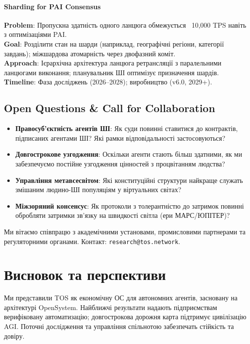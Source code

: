 \documentclass[11pt]{article}
\begin{document}
\paragraph{Sharding for PAI Consensus}
\textbf{Problem}: Пропускна здатність одного ланцюга обмежується ~10,000 TPS навіть з оптимізаціями PAI.\\
\textbf{Goal}: Розділити стан на шарди (наприклад, географічні регіони, категорії завдань); міжшардова атомарність через двофазний коміт.\\
\textbf{Approach}: Ієрархічна архітектура ланцюга ретрансляції з паралельними ланцюгами виконання; планувальник ШІ оптимізує призначення шардів.\\
\textbf{Timeline}: Фаза досліджень (2026--2028); виробництво (v6.0, 2029+).

\subsection{Open Questions \& Call for Collaboration}

\begin{itemize}[noitemsep]
  \item \textbf{Правосуб'єктність агентів ШІ}: Як суди повинні ставитися до контрактів, підписаних агентами ШІ? Які рамки відповідальності застосовуються?
  \item \textbf{Довгострокове узгодження}: Оскільки агенти стають більш здатними, як ми забезпечуємо постійне узгодження цінностей з процвітанням людства?
  \item \textbf{Управління метавсесвітом}: Які конституційні структури найкраще служать змішаним людино-ШІ популяціям у віртуальних світах?
  \item \textbf{Міжзоряний консенсус}: Як протоколи з толерантністю до затримок повинні обробляти затримки зв'язку на швидкості світла (ери МАРС/ЮПІТЕР)?
\end{itemize}

Ми вітаємо співпрацю з академічними установами, промисловими партнерами та регуляторними органами. Контакт: \texttt{research@tos.network}.

\section{Висновок та перспективи}
Ми представили TOS як економічну ОС для автономних агентів, засновану на архітектурі OpenSystem. Найближчі результати надають підприємствам верифіковану автоматизацію; довгострокова дорожня карта підтримує цивілізацію AGI. Поточні дослідження та управління спільнотою забезпечать стійкість та довіру.
\end{document}
